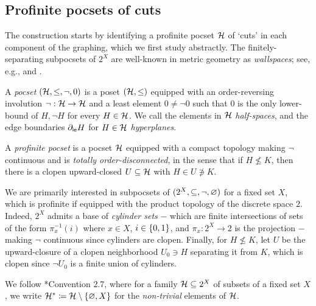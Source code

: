 \documentclass[reqno]{amsart}
\begin{document}
    \subsection{Profinite pocsets of cuts}\label{sec:pocsets_of_cuts}

    The construction starts by identifying a profinite pocset $\mc{H}$ of `cuts' in each component of the graphing, which we first study abstractly. The finitely-separating subpocsets of $2^X$ are well-known in metric geometry as \textit{wallspaces}; see, e.g., \cite{Nic04} and \cite{CN05}.

    \begin{definition}\label{def:profinite_pocset}
        A \textit{pocset} $(\mc{H},\leq,\lnot,0)$ is a poset $(\mc{H},\leq)$ equipped with an order-reversing involution $\lnot:\mc{H}\to\mc{H}$ and a least element $0\neq\lnot0$ such that $0$ is the only lower-bound of $H,\lnot H$ for every $H\in\mc{H}$. We call the elements in $\mc{H}$ \textit{half-spaces}, and the edge boundaries $\del_\mathsf{ie}H$ for $H\in\mc{H}$ \textit{hyperplanes}.

        A \textit{profinite pocset} is a pocset $\mc{H}$ equipped with a compact topology making $\lnot$ continuous and is \textit{totally order-disconnected}, in the sense that if $H\not\leq K$, then there is a clopen upward-closed $U\subseteq\mc{H}$ with $H\in U\not\ni K$.
    \end{definition}


    We are primarily interested in subpocsets of $(2^X,\subseteq,\lnot,\em)$ for a fixed set $X$, which is profinite if equipped with the product topology of the discrete space $2$. Indeed, $2^X$ admits a base of \textit{cylinder sets} $-$ which are finite intersections of sets of the form $\pi^{-1}_x(i)$ where $x\in X$, $i\in\l\{0,1\r\}$, and $\pi_x:2^X\to2$ is the projection $-$ making $\lnot$ continuous since cylinders are clopen. Finally, for $H\not\leq K$,  let $U$ be the upward-closure of a clopen neighborhood $U_0\ni H$ separating it from $K$, which is clopen since $\lnot U_0$ is a finite union of cylinders.

    \begin{remark*}
        We follow \cite{CPTT23}*{Convention 2.7}, where for a family $\mc{H}\subseteq2^X$ of subsets of a fixed set $X$, we write $\mc{H}^\ast\coloneqq\mc{H}\comp\l\{\em,X\r\}$ for the \textit{non-trivial} elements of $\mc{H}$.
    \end{remark*}
\end{document}
